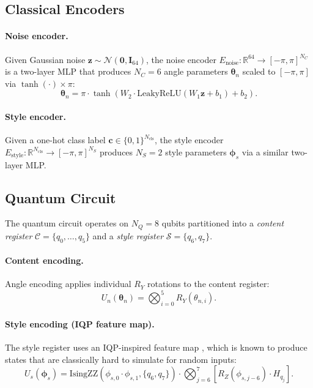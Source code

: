 \documentclass[twocolumn]{article}
\begin{document}
\subsection{Classical Encoders}

\paragraph{Noise encoder.}
Given Gaussian noise $\mathbf{z} \sim \mathcal{N}(\mathbf{0}, \mathbf{I}_{64})$,
the noise encoder $E_\text{noise}: \mathbb{R}^{64} \rightarrow [-\pi, \pi]^{N_C}$
is a two-layer MLP that produces $N_C = 6$ angle parameters $\boldsymbol{\theta}_n$
scaled to $[-\pi, \pi]$ via $\tanh(\cdot) \times \pi$:
\begin{equation}
  \boldsymbol{\theta}_n = \pi \cdot \tanh(W_2 \cdot \text{LeakyReLU}(W_1 \mathbf{z} + b_1) + b_2).
\end{equation}

\paragraph{Style encoder.}
Given a one-hot class label $\mathbf{c} \in \{0,1\}^{N_\text{cls}}$, the style
encoder $E_\text{style}: \mathbb{R}^{N_\text{cls}} \rightarrow [-\pi,\pi]^{N_S}$
produces $N_S = 2$ style parameters $\boldsymbol{\phi}_s$ via a similar two-layer
MLP.

\subsection{Quantum Circuit}
\label{sec:circuit}

The quantum circuit operates on $N_Q = 8$ qubits partitioned into a
\emph{content register} $\mathcal{C} = \{q_0, \ldots, q_5\}$ and a
\emph{style register} $\mathcal{S} = \{q_6, q_7\}$.

\paragraph{Content encoding.} Angle encoding applies individual $R_Y$ rotations
to the content register:
\begin{equation}
  U_n(\boldsymbol{\theta}_n) = \bigotimes_{i=0}^{5} R_Y(\theta_{n,i}).
\end{equation}

\paragraph{Style encoding (IQP feature map).}
The style register uses an IQP-inspired feature map
\cite{havlicek2019supervised}, which is known to produce states that are
classically hard to simulate for random inputs:
\begin{equation}
  U_s(\boldsymbol{\phi}_s) =
    \text{IsingZZ}(\phi_{s,0} \cdot \phi_{s,1}, \{q_6, q_7\}) \cdot
    \bigotimes_{j=6}^{7} [R_Z(\phi_{s,j-6}) \cdot H_{q_j}].
\end{equation}
\end{document}
